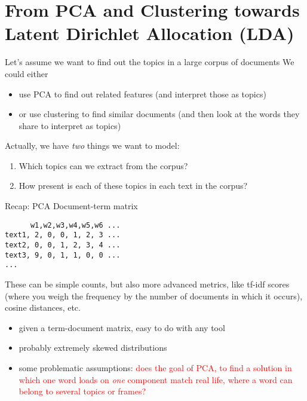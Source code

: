 \section[LDA]{From PCA and Clustering towards Latent Dirichlet Allocation (LDA)}


\begin{frame}{Let's assume we want to find out the topics in a large corpus of documents}
We could either
\begin{itemize}
	\item use PCA to find out related features (and interpret those as topics)
	\item or use clustering to find similar documents (and then look at the words they share to interpret as topics)
\end{itemize}

\pause

Actually, we have \emph{two} things we want to model:

\begin{enumerate}
	\item Which topics can we extract from the corpus?
	\item How present is each of these topics in each text in the corpus?
\end{enumerate}

\end{frame}


\begin{frame}[fragile]{Recap: PCA}
Document-term matrix
\begin{lstlisting}
      w1,w2,w3,w4,w5,w6 ...
text1, 2, 0, 0, 1, 2, 3 ...
text2, 0, 0, 1, 2, 3, 4 ...
text3, 9, 0, 1, 1, 0, 0 ...
...
\end{lstlisting}
{\small{These can be simple counts, but also more advanced metrics, like tf-idf scores (where you weigh the frequency by the number of documents in which it occurs), cosine distances, etc.}}
\pause
	\begin{itemize}
	\item given a term-document matrix, easy to do with any tool
	\item probably extremely skewed distributions
	\item some problematic assumptions: \textcolor{red}{does the goal of PCA, to find a solution in which one word loads on \emph{one} component match real life, where a word can belong to several topics or frames?}
\end{itemize}

\end{frame}


